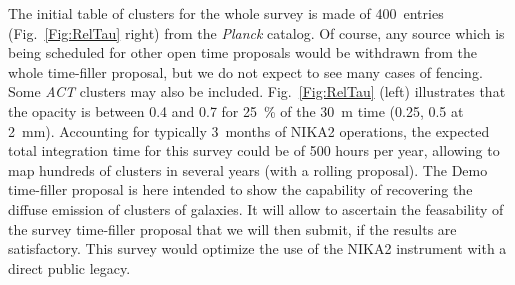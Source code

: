 \documentclass[10pt,a4paper,twoside,graphicx,color]{article}
\begin{document}
The initial table of clusters for the whole survey is made of
400~entries (Fig.~\ref{Fig:RelTau} right) from the {\sl Planck}
catalog. Of course, any source which is being scheduled for other open
time proposals would be withdrawn from the whole time-filler proposal,
but we do not expect to see many cases of fencing. Some {\sl ACT}
clusters may also be included.  Fig.~\ref{Fig:RelTau} (left)
illustrates that the opacity is between 0.4 and 0.7 for 25~\% of the
30~m time (0.25, 0.5 at 2~mm). Accounting for typically 3~months of
NIKA2 operations, the expected total integration time for this survey
could be of 500 hours per year, allowing to map hundreds of clusters
in several years (with a rolling proposal). The Demo time-filler
proposal is here intended to show the capability of recovering the
diffuse emission of clusters of galaxies. It will allow to ascertain
the feasability of the survey time-filler proposal that we will then
submit, if the results are satisfactory. This survey would optimize
the use of the NIKA2 instrument with a direct public legacy.\\
\def\aj{AJ}%
\def\actaa{Acta Astron.}%
\def\araa{ARA\&A}%
\def\apj{ApJ}%
\def\apjl{ApJ}%
\def\apjs{ApJS}%
\def\ao{Appl.~Opt.}%
\def\apss{Ap\&SS}%
\def\aap{A\&A}%
\def\aapr{A\&A~Rev.}%
\def\aaps{A\&AS}%
\def\azh{AZh}%
\def\baas{BAAS}%
\def\bac{Bull. astr. Inst. Czechosl.}%
\def\caa{Chinese Astron. Astrophys.}%
\def\cjaa{Chinese J. Astron. Astrophys.}%
\def\icarus{Icarus}%
\def\jcap{J. Cosmology Astropart. Phys.}%
\def\jrasc{JRASC}%
\def\mnras{MNRAS}%
\def\memras{MmRAS}%
\def\na{New A}%
\def\nar{New A Rev.}%
\def\pasa{PASA}%
\end{document}
